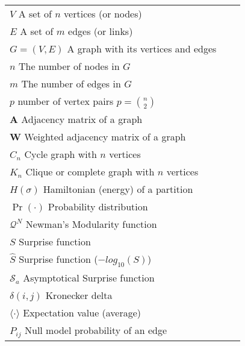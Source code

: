 \begin{longtable}{@{}*{3}{p{\textwidth}@{}}}
$V$ \quad {\color{gray!50}\hrulefill} \quad  A set of $n$ vertices (or nodes) \\
$E$ \quad {\color{gray!50}\hrulefill} \quad  A set of $m$ edges (or links) \\
$G=(V,E)$ \quad {\color{gray!50}\hrulefill} \quad  A graph with its vertices and edges \\
$n$ \quad {\color{gray!50}\hrulefill} \quad  The number of nodes in $G$ \\
$m$ \quad {\color{gray!50}\hrulefill} \quad  The number of edges in $G$ \\
$p$ \quad {\color{gray!50}\hrulefill} \quad  number of vertex pairs $p=\binom{n}{2}$\\
$\mathbf{A}$ \quad {\color{gray!50}\hrulefill} \quad  Adjacency matrix of a graph \\
$\mathbf{W}$ \quad {\color{gray!50}\hrulefill} \quad  Weighted adjacency matrix of a graph \\
$C_n$ \quad {\color{gray!50}\hrulefill} \quad  Cycle graph with $n$ vertices \\
$K_n$ \quad {\color{gray!50}\hrulefill} \quad  Clique or complete graph with $n$ vertices \\
$H(\sigma)$ \quad {\color{gray!50}\hrulefill} \quad  Hamiltonian (energy) of a partition \\
$\Pr(\cdot)$ \quad {\color{gray!50}\hrulefill} \quad  Probability distribution \\
$\mathcal{Q}^N$ \quad {\color{gray!50}\hrulefill} \quad Newman's Modularity function \\
$S$ \quad {\color{gray!50}\hrulefill} \quad  Surprise function\\
$\hat{S}$ \quad {\color{gray!50}\hrulefill} \quad  Surprise function ($-log_{10}(S)$) \\
$\mathcal{S}_a$ \quad {\color{gray!50}\hrulefill} \quad  Asymptotical Surprise function \\
$\delta(i,j)$ \quad {\color{gray!50}\hrulefill} \quad  Kronecker delta \\
$\langle \cdot \rangle$ \quad {\color{gray!50}\hrulefill} \quad  Expectation value (average) \\
$P_{ij}$ \quad {\color{gray!50}\hrulefill} \quad  Null model probability of an edge\\

\end{longtable}

